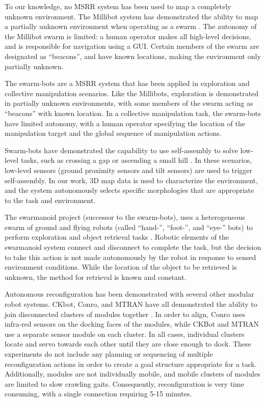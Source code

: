 \documentclass[conference]{IEEEtran}
\begin{document}
To our knowledge, no MSRR system has been used to map a completely unknown environment. The Millibot system has demonstrated the ability to map a partially unknown environment when operating as a swarm \cite{Grabowski2000}. The autonomy of the Millibot swarm is limited: a human operator makes all high-level decisions, and is responsible for navigation using a GUI. Certain members of the swarm are designated as ``beacons'', and have known locations, making the environment only partially unknown.

The swarm-bots are a MSRR system that has been applied in exploration \cite{Dorigo2005} and collective manipulation \cite{Mondada2005} scenarios.  Like the Millibots, exploration is demonstrated in partially unknown environments, with some members of the swarm acting as ``beacons'' with known location.  In a collective manipulation task, the swarm-bots have limited autonomy, with a human operator specifying the location of the manipulation target and the global sequence of manipulation actions.

Swarm-bots have demonstrated the capability to use self-assembly to solve low-level tasks, such as crossing a gap \cite{Mondada2004} or ascending a small hill \cite{OGrady2005}.  In these scenarios, low-level sensors (ground proximity sensors and tilt sensors) are used to trigger self-assembly.  In our work, 3D map data is used to characterize the environment, and the system autonomously selects specific morphologies that are appropriate to the task and environment. 

The swarmanoid project (successor to the swarm-bots), uses a heterogeneous swarm of ground and flying robots (called ``hand-'', ``foot-'', and ``eye-'' bots) to perform exploration and object retrieval tasks  \cite{Dorigo2013}. Robotic elements of the swarmanoid system connect and disconnect to complete the task, but the decision to take this action is not made autonomously by the robot in response to sensed environment conditions. While the location of the object to be retrieved is unknown, the method for retrieval is known and constant.

Autonomous reconfiguration has been demonstrated with several other modular robot systems. CKbot, Conro, and MTRAN have all demonstrated the ability to join disconnected clusters of modules together \cite{Yim2007, Rubenstein2004,Murata2006}. In order to align, Conro uses infra-red sensors on the docking faces of the modules, while CKBot and MTRAN use a separate sensor module on each cluster.  In all cases, individual clusters locate and servo towards each other until they are close enough to dock. These experiments do not include any planning or sequencing of multiple reconfiguration actions in order to create a goal structure appropriate for a task.  Additionally,  modules are not individually mobile, and mobile clusters of modules are limited to slow crawling gaits.  Consequently, reconfiguration is very time consuming, with a single connection requiring 5-15 minutes.
\end{document}
